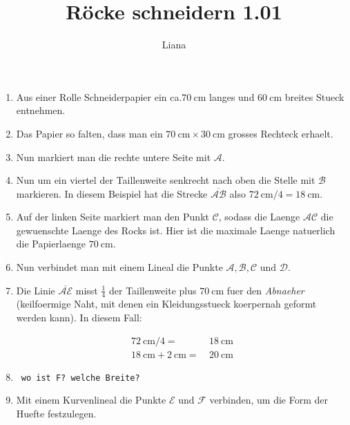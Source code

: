 \documentclass{scrartcl}
\begin{document}
  \title{R\"ocke schneidern 1.01}
  \author{Liana}
\maketitle

\begin{enumerate}
  \item Aus einer Rolle Schneiderpapier ein ca.$\SI{70}{\centi\meter}$ langes
    und $\SI{60}{\centi\meter}$ breites Stueck entnehmen.

  \item Das Papier so falten, dass man ein $\SI{70}{\centi\meter}\times
    \SI{30}{\centi\meter}$ grosses Rechteck erhaelt.
 
  \item Nun markiert man die rechte untere Seite mit $\mathcal{A}$.
 
  \item Nun um ein viertel der Taillenweite senkrecht nach oben die Stelle mit 
    $\mathcal{B}$ markieren. In diesem Beispiel hat die Strecke
    $\overline{\mathcal{AB}}$ also $\SI{72}{\centi\meter}/4 = 
    \SI{18}{\centi\meter}$.
 
  \item Auf der linken Seite markiert man den Punkt $\mathcal{C}$, sodass
    die Laenge $\mathcal{AC}$ die gewuenschte Laenge des Rocks ist. Hier ist
    die maximale Laenge natuerlich die Papierlaenge $\SI{70}{\centi\meter}$.
  
  \item Nun verbindet man mit einem Lineal die Punkte 
    $\mathcal{A,B,C} \text{ und } \mathcal{D}$.
  
  \item Die Linie $\overline{\mathcal{AE}}$ misst $\frac{1}{4}$ der Taillenweite
    plus $\SI{70}{\centi\meter}$ fuer den \emph{Abnaeher} (keilfoermige Naht,
    mit  denen ein Kleidungsstueck koerpernah geformt werden kann). In diesem
    Fall: \vspace{-1cm}

      \begin{align*}
	\SI{72}{\centi\meter}/4=&~\SI{18}{\centi\meter} \\
	\SI{18}{\centi\meter}+\SI{2}{\centi\meter}=&~\SI{20}{\centi\meter}
	\label{abnaeher}
      \end{align*}

  \item \Emailct ~\texttt{wo ist F? welche Breite?} %

  \item Mit einem Kurvenlineal die Punkte $\mathcal{E}\text{ und }
      \mathcal{F}$ verbinden, um die Form der Huefte festzulegen.
 

\end{enumerate}
\end{document}
